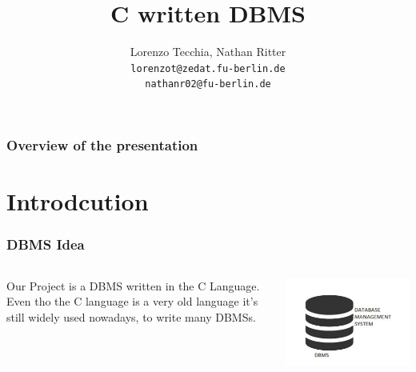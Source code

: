 \documentclass{beamer}
\title{C written DBMS}
\author[Tecchia, Ritter]{Lorenzo Tecchia, Nathan Ritter \\
\texttt{lorenzot@zedat.fu-berlin.de} \\
\texttt{nathanr02@fu-berlin.de}}
\institute[FU Berlin]{Freie Universität Berlin}
\begin{document}
\begin{frame}
	\maketitle
\end{frame}

\begin{frame}
	\frametitle{Overview of the presentation}
	\tableofcontents
\end{frame}

\section{Introdcution}
\begin{frame}
	\frametitle{DBMS Idea}
	\begin{columns}
	\begin{column}{0.4\textwidth}	
		Our Project is a DBMS written in the C Language. \\ Even tho the C language is a very old language it's still widely used nowadays, to write many DBMSs.
	\end{column}
	
	\begin{column}{0.4\textwidth}

\includegraphics[width=1.4\columnwidth]{th-1536893874.jpg}			
	
	\end{column}

	\end{columns}
\end{frame}
\end{document}
